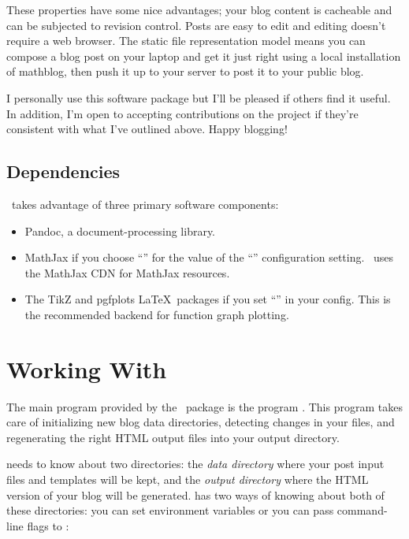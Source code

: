 \documentclass[11pt, letterpaper, oneside, titlepage]{book}
\begin{document}
These properties have some nice advantages; your blog content is
cacheable and can be subjected to revision control.  Posts are easy to
edit and editing doesn't require a web browser.  The static file
representation model means you can compose a blog post on your laptop
and get it just right using a local installation of mathblog, then
push it up to your server to post it to your public blog.

I personally use this software package but I'll be pleased if others
find it useful.  In addition, I'm open to accepting contributions on
the project if they're consistent with what I've outlined above.
Happy blogging!

\section{Dependencies}

\mathblog\ takes advantage of three primary software components:

\begin{itemize}
\item{Pandoc, a document-processing library.}
\item{MathJax if you choose ``'' for the value of the
  ``'' configuration setting.  \mathblog\ uses the
  MathJax CDN for MathJax resources.}
\item{The TikZ and pgfplots \LaTeX\ packages if you set ``'' in your config.  This is the recommended backend for
  function graph plotting.}
\end{itemize}

\chapter{Working With \mathblog}

The main program provided by the \mathblog\ package is the program
.  This program takes care of initializing new blog data
directories, detecting changes in your files, and regenerating the
right HTML output files into your output directory.

 needs to know about two directories: the \textit{data
  directory} where your post input files and templates will be kept,
and the \textit{output directory} where the HTML version of your blog
will be generated.   has two ways of knowing about both of
these directories: you can set environment variables or you can pass
command-line flags to :
\end{document}
